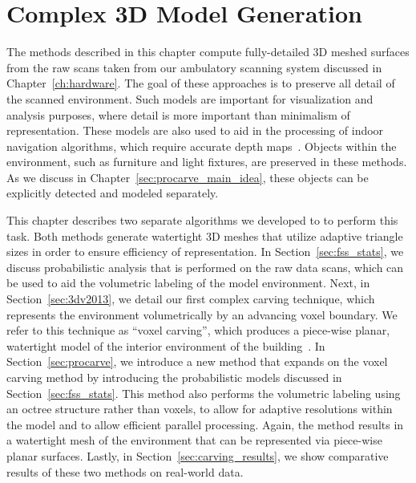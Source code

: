 \documentclass[12pt,onecolumn,oneside]{book}
\begin{document}

\chapter{Complex 3D Model Generation}
\label{ch:carving}

The methods described in this chapter compute fully-detailed 3D meshed surfaces from the raw scans taken from our ambulatory scanning system discussed in Chapter~\ref{ch:hardware}.  The goal of these approaches is to preserve all detail of the scanned environment.  Such models are important for visualization and analysis purposes, where detail is more important than minimalism of representation.  These models are also used to aid in the processing of indoor navigation algorithms, which require accurate depth maps~\cite{Liang13}.  Objects within the environment, such as furniture and light fixtures, are preserved in these methods.  As we discuss in Chapter~\ref{sec:procarve_main_idea}, these objects can be explicitly detected and modeled separately.

This chapter describes two separate algorithms we developed to to perform this task.  Both methods generate watertight 3D meshes that utilize adaptive triangle sizes in order to ensure efficiency of representation.  In Section~\ref{sec:fss_stats}, we discuss probabilistic analysis that is performed on the raw data scans, which can be used to aid the volumetric labeling of the model environment.  Next, in Section~\ref{sec:3dv2013}, we detail our first complex carving technique, which represents the environment volumetrically by an advancing voxel boundary.  We refer to this technique as ``voxel carving'', which produces a piece-wise planar, watertight model of the interior environment of the building~\cite{Turner13}.  In Section~\ref{sec:procarve}, we introduce a new method that expands on the voxel carving method by introducing the probabilistic models discussed in Section~\ref{sec:fss_stats}.  This method also performs the volumetric labeling using an octree structure rather than voxels, to allow for adaptive resolutions within the model and to allow efficient parallel processing.  Again, the method results in a watertight mesh of the environment that can be represented via piece-wise planar surfaces.  Lastly, in Section~\ref{sec:carving_results}, we show comparative results of these two methods on real-world data.
\end{document}
